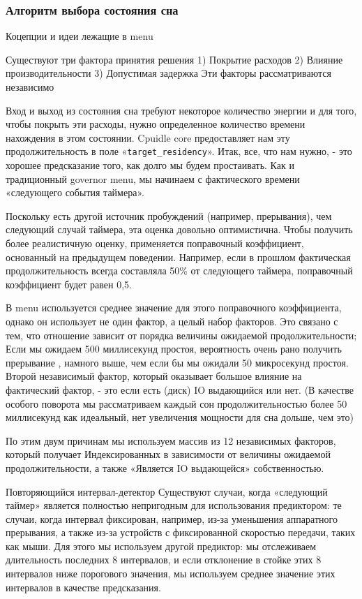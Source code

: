 \documentclass{article}
\begin{document}
\subsubsection{Алгоритм выбора состояния сна}

Коцепции и идеи лежащие в menu

Существуют три фактора принятия решения
1) Покрытие расходов 
2) Влияние производительности
3) Допустимая задержка
Эти факторы рассматриваются независимо

Вход и выход из состояния сна требуют некоторое количество энергии и для того, чтобы покрыть эти расходы, нужно определенное количество времени нахождения в этом состоянии. Cpuidle core предоставляет нам эту продолжительность в поле «\texttt{target\_residency}». Итак, все, что нам нужно, - это хорошее предсказание того, как долго мы будем простаивать. Как и традиционный governor menu, мы начинаем с фактического времени «следующего события таймера».

Поскольку есть другой источник пробуждений (например, прерывания), чем следующий случай таймера, эта оценка довольно оптимистична. Чтобы получить более реалистичную оценку, применяется поправочный коэффициент, основанный на предыдущем поведении. Например, если в прошлом фактическая продолжительность всегда составляла 50\% от следующего таймера, поправочный коэффициент будет равен 0,5.

В menu используется среднее значение для этого поправочного коэффициента, однако он использует не один фактор, а целый набор факторов. Это связано с тем, что отношение зависит от порядка величины ожидаемой продолжительности; Если мы ожидаем 500 миллисекунд простоя, вероятность очень рано получить прерывание , намного выше, чем если бы мы ожидали 50 микросекунд простоя. Второй независимый фактор, который оказывает большое влияние на фактический фактор, - это если есть (диск) IO выдающийся или нет. (В качестве особого поворота мы рассматриваем каждый сон продолжительностью более 50 миллисекунд как идеальный, нет увеличения мощности для сна дольше, чем это)

По этим двум причинам мы используем массив из 12 независимых факторов, который получает
Индексированных в зависимости от величины ожидаемой продолжительности, а также
«Является IO выдающейся» собственностью.

Повторяющийся интервал-детектор
Существуют случаи, когда «следующий таймер» является полностью непригодным для использования предиктором: те случаи, когда интервал фиксирован, например, из-за уменьшения аппаратного прерывания, а также из-за устройств с фиксированной скоростью передачи, таких как мыши.
Для этого мы используем другой предиктор: мы отслеживаем длительность последних 8 интервалов, и если отклонение в стойке этих 8 интервалов ниже порогового значения, мы используем среднее значение этих интервалов в качестве предсказания.
\end{document}
